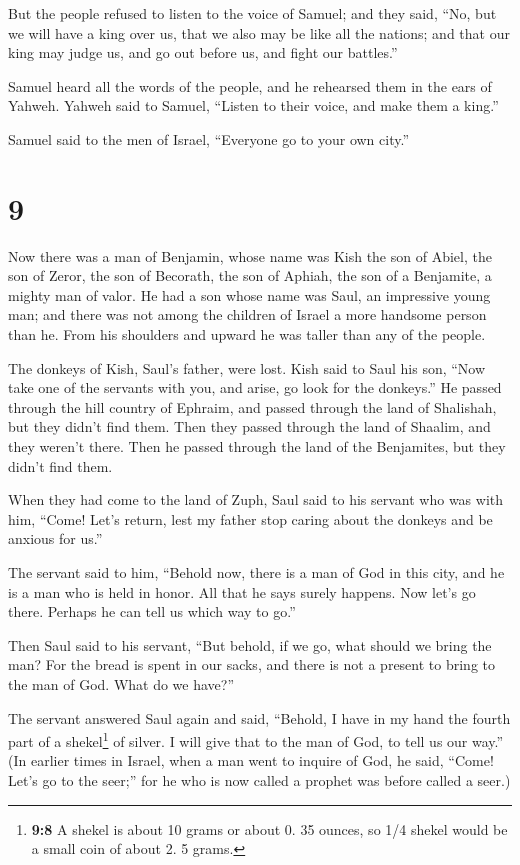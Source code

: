  But the people refused to listen to the voice of Samuel;
and they said, ``No, but we will have a king over us, 
that we also may be like all the nations; and that our king may judge
us, and go out before us, and fight our battles.''

 Samuel heard all the words of the people, and he
rehearsed them in the ears of Yahweh.  Yahweh said to
Samuel, ``Listen to their voice, and make them a king.''

Samuel said to the men of Israel, ``Everyone go to your own city.''

\hypertarget{section-8}{%
\section{9}\label{section-8}}

 Now there was a man of Benjamin, whose name was Kish the
son of Abiel, the son of Zeror, the son of Becorath, the son of Aphiah,
the son of a Benjamite, a mighty man of valor.  He had a
son whose name was Saul, an impressive young man; and there was not
among the children of Israel a more handsome person than he. From his
shoulders and upward he was taller than any of the people.

 The donkeys of Kish, Saul's father, were lost. Kish said
to Saul his son, ``Now take one of the servants with you, and arise, go
look for the donkeys.''  He passed through the hill
country of Ephraim, and passed through the land of Shalishah, but they
didn't find them. Then they passed through the land of Shaalim, and they
weren't there. Then he passed through the land of the Benjamites, but
they didn't find them.

 When they had come to the land of Zuph, Saul said to his
servant who was with him, ``Come! Let's return, lest my father stop
caring about the donkeys and be anxious for us.''

 The servant said to him, ``Behold now, there is a man of
God in this city, and he is a man who is held in honor. All that he says
surely happens. Now let's go there. Perhaps he can tell us which way to
go.''

 Then Saul said to his servant, ``But behold, if we go,
what should we bring the man? For the bread is spent in our sacks, and
there is not a present to bring to the man of God. What do we have?''

 The servant answered Saul again and said, ``Behold, I
have in my hand the fourth part of a shekel\footnote{\textbf{9:8} A
  shekel is about 10 grams or about 0. 35 ounces, so 1/4 shekel would be
  a small coin of about 2. 5 grams.} of silver. I will give that to the
man of God, to tell us our way.''  (In earlier times in
Israel, when a man went to inquire of God, he said, ``Come! Let's go to
the seer;'' for he who is now called a prophet was before called a
seer.)

